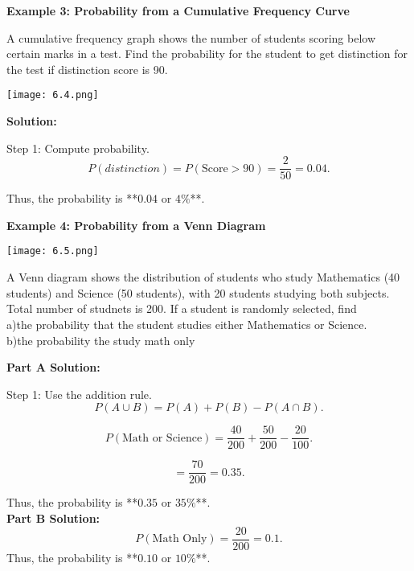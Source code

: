 \begin{flushleft}
	\textbf{Example 3: Probability from a Cumulative Frequency Curve}
	
	A cumulative frequency graph shows the number of students scoring below certain marks in a test. Find the probability for the student to get distinction for the test if distinction score is 90. 
	\begin{center}
		\texttt{[image: 6.4.png]}
	\end{center}
	
	\textbf{Solution:}
	
	Step 1: Compute probability.
	\[
	P(distinction)=P(\text{Score} >90) = \frac{2}{50} = 0.04.
	\]
	
	Thus, the probability is **$0.04$ or $4\%$**.
\end{flushleft}

\begin{flushleft}
	\textbf{Example 4: Probability from a Venn Diagram}
	\begin{center}
		\texttt{[image: 6.5.png]}
	\end{center}
	A Venn diagram shows the distribution of students who study Mathematics (40 students) and Science (50 students), with 20 students studying both subjects. Total number of studnets is 200. If a student is randomly selected, find \\
	a)the probability that the student studies either Mathematics or Science.\\
	b)the probability the study math only
	
	\textbf{Part A Solution:}
	
	Step 1: Use the addition rule.
	\[
	P(A \cup B) = P(A) + P(B) - P(A \cap B).
	\]
	
	\[
	P(\text{Math or Science}) = \frac{40}{200} + \frac{50}{200} - \frac{20}{100}.
	\]
	
	\[
	= \frac{70}{200} = 0.35.
	\]
	
	Thus, the probability is **$0.35$ or $35\%$**.\\
	\vspace{10pt}
	\textbf{Part B Solution:}
	\[
	P(\text{Math Only}) = \frac{20}{200}=0.1.
	\]
	Thus, the probability is **$0.10$ or $10\%$**.
	
\end{flushleft}
